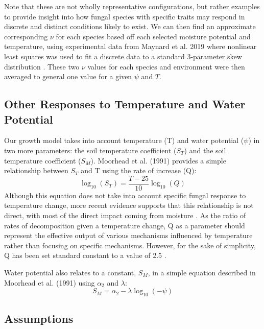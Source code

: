 \documentclass[12pt]{article}
\begin{document}
Note that these are not wholly representative configurations, but rather examples to provide insight into how fungal species with specific traits may respond in discrete and distinct conditions likely to exist. We can then find an approximate corresponding $\nu$ for each species based off each selected moisture potential and temperature, using experimental data from Maynard et al. 2019 where nonlinear least squares was used to fit a discrete data to a standard 3-parameter skew distribution \cite{Maynard2019}. These two $\nu$ values for each species and environment were then averaged to general one value for a given $\psi$ and $T$.

\begin{multicols}{2}	
\subsection{Other Responses to Temperature and Water Potential}\label{Other Responses to Temperature and Water Potential}

Our growth model takes into account temperature (T) and water potential ($\psi$) in two more parameters: the soil temperature coefficient ($S_T$) and the soil temperature coefficient ($S_M$). Moorhead et al. (1991) provides a simple relationship between $S_T$ and T using the rate of increase (Q):
\begin{equation}
\log_{10}(S_T) = \frac{T-25}{10}\log_{10}(Q)
\end{equation}
Although this equation does not take into account specific fungal response to temperature change, more recent evidence supports that this relationship is not direct, with most of the direct impact coming from moisture \cite{Petraglia2019}. As the ratio of rates of decomposition given a temperature change, Q as a parameter should represent the effective output of various mechanisms influenced by temperature rather than focusing on specific mechanisms. However, for the sake of simplicity, Q has been set standard constant to a value of 2.5 \cite{Moorhead1991}.

Water potential also relates to a constant, $S_M$, in a simple equation described in Moorhead et al. (1991) using $\alpha_2$ and $\lambda$:
\begin{equation}
S_M = \alpha_2 -\lambda \log_{10}(-\psi)
\end{equation}

\subsection{Assumptions}


\end{multicols}
\end{document}
